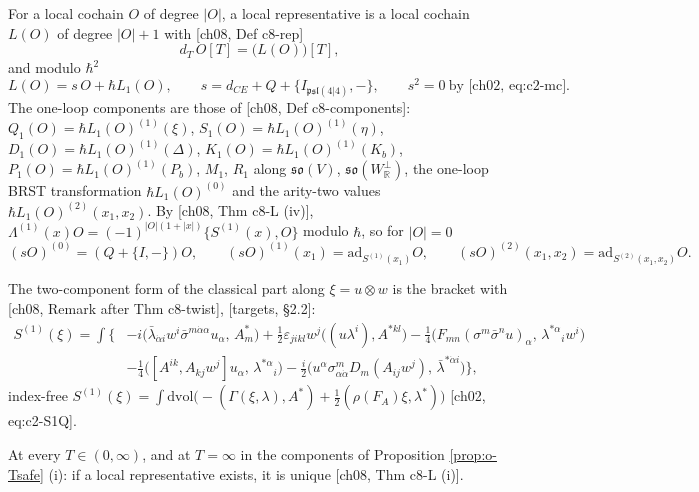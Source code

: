\begin{definition}
\label{def:o-comp}
For a local cochain $O$ of degree $|O|$, a local representative is a local cochain $L(O)$ of degree $|O|+1$ with [ch08, Def c8-rep]
\begin{equation}
d_T\,O[T]=\big(L(O)\big)[T],
\label{eq:o-rep}
\end{equation}
and modulo $\hbar^2$
\begin{equation}
L(O)=s\,O+\hbar L_1(O),\qquad s=d_{CE}+Q+\{I_{\mathfrak{psl}(4|4)},-\},\qquad s^2=0\ \text{by [ch02, eq:c2-mc]}.
\label{eq:o-L1}
\end{equation}
The one-loop components are those of [ch08, Def c8-components]: $Q_1(O)=\hbar L_1(O)^{(1)}(\xi)$, $S_1(O)=\hbar L_1(O)^{(1)}(\eta)$, $D_1(O)=\hbar L_1(O)^{(1)}(\Delta)$, $K_1(O)=\hbar L_1(O)^{(1)}(K_b)$, $P_1(O)=\hbar L_1(O)^{(1)}(P_b)$, $M_1$, $R_1$ along $\mathfrak{so}(V)$, $\mathfrak{so}(W_{\mathbb R}^\perp)$, the one-loop BRST transformation $\hbar L_1(O)^{(0)}$ and the arity-two values $\hbar L_1(O)^{(2)}(x_1,x_2)$. By [ch08, Thm c8-L (iv)], $\Lambda^{(1)}(x)O=(-1)^{|O|(1+|x|)}\{S^{(1)}(x),O\}$ modulo $\hbar$, so for $|O|=0$
\[
(sO)^{(0)}=(Q+\{I,-\})O,\qquad (sO)^{(1)}(x_1)=\mathrm{ad}_{S^{(1)}(x_1)}O,\qquad (sO)^{(2)}(x_1,x_2)=\mathrm{ad}_{S^{(2)}(x_1,x_2)}O .
\]
\end{definition}

The two-component form of the classical part along $\xi=u\otimes w$ is the bracket with [ch08, Remark after Thm c8-twist], [targets, §2.2]:
\begin{equation}
\begin{aligned}
S^{(1)}(\xi)=\int\Big\{&-i\big(\bar\lambda_{\dot\alpha i}w^i\bar\sigma^{m\dot\alpha\alpha}u_\alpha,\,A^*_m\big)+\tfrac12\varepsilon_{jikl}w^j\big((u\lambda^i),A^{*kl}\big)-\tfrac14\big(F_{mn}(\sigma^m\bar\sigma^nu)_\alpha,\,\lambda^{*\alpha}{}_iw^i\big)\\
&-\tfrac14\big([A^{ik},A_{kj}w^j]u_\alpha,\,\lambda^{*\alpha}{}_i\big)-\tfrac i2\big(u^\alpha\sigma^m_{\alpha\dot\alpha}D_m(A_{ij}w^j),\,\bar\lambda^{*\dot\alpha i}\big)\Big\},
\end{aligned}
\label{eq:o-S1xi}
\end{equation}
index-free $S^{(1)}(\xi)=\int\mathrm{dvol}\big(-(\Gamma(\xi,\lambda),A^*)+\tfrac12(\rho(F_A)\xi,\lambda^*)\big)$ [ch02, eq:c2-S1Q].

\begin{proposition}[Uniqueness]
\label{prop:o-unique}
At every $T\in(0,\infty)$, and at $T=\infty$ in the components of Proposition \ref{prop:o-Tsafe} (i): if a local representative exists, it is unique [ch08, Thm c8-L (i)].
\end{proposition}

